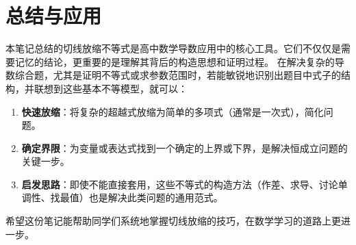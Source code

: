 \documentclass[a4paper,12pt]{ctexart}
\theoremstyle{mytheoremstyle}
\begin{document}
\section{\textcolor{MyBlue}{总结与应用}}
本笔记总结的切线放缩不等式是高中数学导数应用中的核心工具。它们不仅仅是需要记忆的结论，更重要的是理解其背后的构造思想和证明过程。
在解决复杂的导数综合题，尤其是证明不等式或求参数范围时，若能敏锐地识别出题目中式子的结构，并联想到这些基本不等模型，就可以：
\begin{enumerate}
    \item \textbf{快速放缩}：将复杂的超越式放缩为简单的多项式（通常是一次式），简化问题。
    \item \textbf{确定界限}：为变量或表达式找到一个确定的上界或下界，是解决恒成立问题的关键一步。
    \item \textbf{启发思路}：即使不能直接套用，这些不等式的构造方法（作差、求导、讨论单调性、找最值）也是解决此类问题的通用范式。
\end{enumerate}
希望这份笔记能帮助同学们系统地掌握切线放缩的技巧，在数学学习的道路上更进一步。
\end{document}
